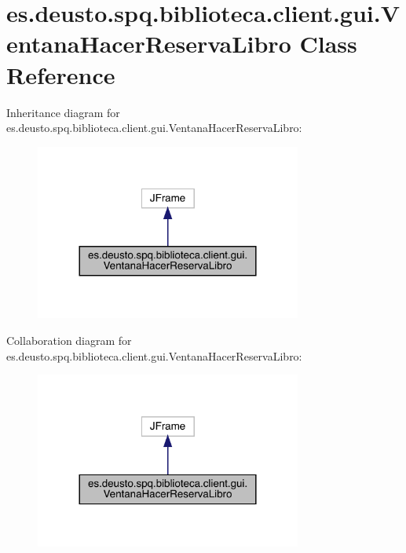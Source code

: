 \hypertarget{classes_1_1deusto_1_1spq_1_1biblioteca_1_1client_1_1gui_1_1_ventana_hacer_reserva_libro}{}\section{es.\+deusto.\+spq.\+biblioteca.\+client.\+gui.\+Ventana\+Hacer\+Reserva\+Libro Class Reference}
\label{classes_1_1deusto_1_1spq_1_1biblioteca_1_1client_1_1gui_1_1_ventana_hacer_reserva_libro}


Inheritance diagram for es.\+deusto.\+spq.\+biblioteca.\+client.\+gui.\+Ventana\+Hacer\+Reserva\+Libro\+:
\nopagebreak
\begin{figure}[H]
\begin{center}
\leavevmode
\includegraphics[width=248pt]{classes_1_1deusto_1_1spq_1_1biblioteca_1_1client_1_1gui_1_1_ventana_hacer_reserva_libro__inherit__graph}
\end{center}
\end{figure}


Collaboration diagram for es.\+deusto.\+spq.\+biblioteca.\+client.\+gui.\+Ventana\+Hacer\+Reserva\+Libro\+:
\nopagebreak
\begin{figure}[H]
\begin{center}
\leavevmode
\includegraphics[width=248pt]{classes_1_1deusto_1_1spq_1_1biblioteca_1_1client_1_1gui_1_1_ventana_hacer_reserva_libro__coll__graph}
\end{center}
\end{figure}
